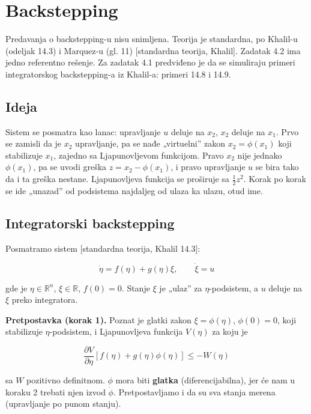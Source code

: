 \documentclass[11pt,a4paper,parskip=half,headsepline,numbers=noenddot]{scrartcl}
\DeclareRobustCommand{\izvor}[1]{{\small\color{izvorC}[#1]}}
\begin{document}
\section{Backstepping}

Predavanja o backstepping-u nisu snimljena. Teorija je standardna, po Khalil-u (odeljak 14.3) i Marquez-u (gl. 11) \izvor{standardna teorija, Khalil}. Zadatak 4.2 ima jedno referentno rešenje. Za zadatak 4.1 predviđeno je da se simuliraju primeri integratorskog backstepping-a iz Khalil-a: primeri 14.8 i 14.9.

\subsection{Ideja}

Sistem se posmatra kao lanac: upravljanje \(u\) deluje na \(x_2\), \(x_2\) deluje na \(x_1\). Prvo se zamisli da je \(x_2\) upravljanje, pa se nađe „virtuelni'' zakon \(x_2 = \phi(x_1)\) koji stabilizuje \(x_1\), zajedno sa Ljapunovljevom funkcijom. Pravo \(x_2\) nije jednako \(\phi(x_1)\), pa se uvodi greška \(z = x_2 - \phi(x_1)\), i pravo upravljanje \(u\) se bira tako da i ta greška nestane. Ljapunovljeva funkcija se proširuje sa \(\frac12z^2\). Korak po korak se ide „unazad'' od podsistema najdaljeg od ulaza ka ulazu, otud ime.

\subsection{Integratorski backstepping}

Posmatramo sistem \izvor{standardna teorija, Khalil 14.3}:

\[\dot\eta = f(\eta) + g(\eta)\xi, \qquad \dot\xi = u\]

gde je \(\eta \in \mathbb{R}^n\), \(\xi \in \mathbb{R}\), \(f(0) = 0\). Stanje \(\xi\) je „ulaz'' za \(\eta\)-podsistem, a \(u\) deluje na \(\xi\) preko integratora.

\textbf{Pretpostavka (korak 1).} Poznat je glatki zakon \(\xi = \phi(\eta)\), \(\phi(0) = 0\), koji stabilizuje \(\eta\)-podsistem, i Ljapunovljeva funkcija \(V(\eta)\) za koju je

\[\frac{\partial V}{\partial\eta}\left[f(\eta) + g(\eta)\phi(\eta)\right] \le -W(\eta)\]

sa \(W\) pozitivno definitnom. \(\phi\) mora biti \textbf{glatka} (diferencijabilna), jer će nam u koraku 2 trebati njen izvod \(\dot\phi\). Pretpostavljamo i da su sva stanja merena (upravljanje po punom stanju).
\end{document}
